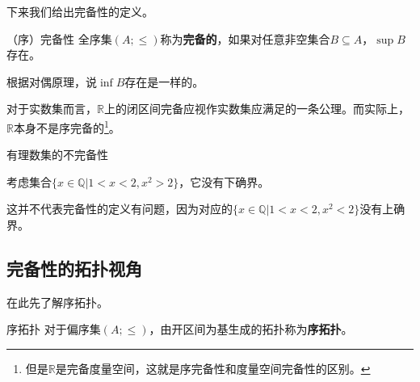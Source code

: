 下来我们给出完备性的定义。

\begin{definition}{（序）完备性}
全序集$(A;\leq)$称为\textbf{完备的}，如果对任意非空集合$B\subseteq A$，$\sup B$存在。
\end{definition}

根据对偶原理，说$\inf B$存在是一样的。

对于实数集而言，$\mathbb{R}$上的闭区间完备应视作实数集应满足的一条公理。而实际上，$\mathbb{R}$本身不是序完备的\footnote{但是$\mathbb{R}$是完备度量空间，这就是序完备性和度量空间完备性的区别。}。

\begin{example}{有理数集的不完备性}

考虑集合$\{x\in\mathbb{Q}|1<x<2,x^2>2\}$，它没有下确界。

这并不代表完备性的定义有问题，因为对应的$\{x\in\mathbb{Q}|1<x<2,x^2<2\}$没有上确界。
\end{example}

\subsection{完备性的拓扑视角}


在此先了解序拓扑。

\begin{definition}{序拓扑}
对于偏序集$(A;\leq)$，由开区间为基生成的拓扑称为\textbf{序拓扑}。
\end{definition}

